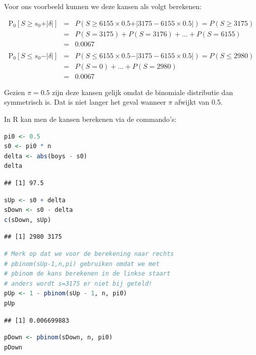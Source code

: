 \documentclass[
  12pt,dutch,coursenotes]{book}
\begin{document}
Voor ons voorbeeld kunnen we deze kansen als volgt berekenen:

\begin{eqnarray*}
\text{P}_0\left[S\geq s_0+ \vert \delta\vert \right] &=& P(S \geq 6155 \times 0.5 + \vert 3175 - 6155 \times 0.5\vert ) = P(S \geq 3175)\\
&= &P(S= 3175) + P(S=3176) + ... + P(S=6155)\\
& =& 0.0067\\\\
\text{P}_0\left[S \leq s_0 - \vert \delta\vert \right] &=& P(S \leq  6155 \times 0.5 - \vert 3175- 6155 \times 0.5\vert) = P(S \leq 2980)\\ &= &P(S=0) + ... + P(S=2980) \\
&=&0.0067
\end{eqnarray*}

Gezien \(\pi=0.5\) zijn deze kansen gelijk omdat de binomiale distributie dan symmetrisch is. Dat is niet langer het geval wanneer \(\pi\) afwijkt van 0.5.

In R kan men de kansen berekenen via de commando's:

\begin{lstlisting}[language=R]
pi0 <- 0.5
s0 <- pi0 * n
delta <- abs(boys - s0)
delta
\end{lstlisting}

\begin{lstlisting}
## [1] 97.5
\end{lstlisting}

\begin{lstlisting}[language=R]
sUp <- s0 + delta
sDown <- s0 - delta
c(sDown, sUp)
\end{lstlisting}

\begin{lstlisting}
## [1] 2980 3175
\end{lstlisting}

\begin{lstlisting}[language=R]
# Merk op dat we voor de berekening naar rechts
# pbinom(sUp-1,n,pi) gebruiken omdat we met
# pbinom de kans berekenen in de linkse staart
# anders wordt s=3175 er niet bij geteld!
pUp <- 1 - pbinom(sUp - 1, n, pi0)
pUp
\end{lstlisting}

\begin{lstlisting}
## [1] 0.006699883
\end{lstlisting}

\begin{lstlisting}[language=R]
pDown <- pbinom(sDown, n, pi0)
pDown
\end{lstlisting}
\end{document}
